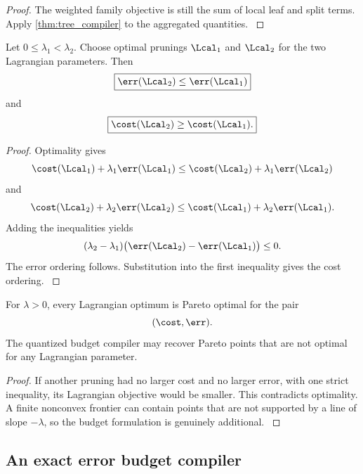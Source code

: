 \begin{proof}\label{main:proof:044}
The weighted family objective is still the sum of local leaf and split terms. Apply \cref{thm:tree_compiler} to the aggregated quantities.
\label{main:proof:044:end}\end{proof}

\begin{proposition}\label{main:proposition:009}\label{prop:lagrangian_frontier}
Let \(0\leq\lambda_1<\lambda_2\). Choose optimal prunings \(\Lcal_1\) and \(\Lcal_2\) for the two Lagrangian parameters. Then
\[
\boxed{
\err(\Lcal_2)
\leq
\err(\Lcal_1)
}
\]
and
\[
\boxed{
\cost(\Lcal_2)
\geq
\cost(\Lcal_1).
}
\]
\end{proposition}

\begin{proof}\label{main:proof:045}
Optimality gives
\[
\cost(\Lcal_1)+\lambda_1\err(\Lcal_1)
\leq
\cost(\Lcal_2)+\lambda_1\err(\Lcal_2)
\]
and
\[
\cost(\Lcal_2)+\lambda_2\err(\Lcal_2)
\leq
\cost(\Lcal_1)+\lambda_2\err(\Lcal_1).
\]
Adding the inequalities yields
\[
(\lambda_2-\lambda_1)
\bigl(
\err(\Lcal_2)-\err(\Lcal_1)
\bigr)
\leq0.
\]
The error ordering follows. Substitution into the first inequality gives the cost ordering.
\label{main:proof:045:end}\end{proof}

\begin{corollary}\label{main:corollary:014}\label{cor:supported_pareto}
For \(\lambda>0\), every Lagrangian optimum is Pareto optimal for the pair
\[
(\cost,\err).
\]
The quantized budget compiler may recover Pareto points that are not optimal for any Lagrangian parameter.
\end{corollary}

\begin{proof}\label{main:proof:046}
If another pruning had no larger cost and no larger error, with one strict inequality, its Lagrangian objective would be smaller. This contradicts optimality. A finite nonconvex frontier can contain points that are not supported by a line of slope \(-\lambda\), so the budget formulation is genuinely additional.
\label{main:proof:046:end}\end{proof}

\subsection{An exact error budget compiler}\label{main:subsection:014}

